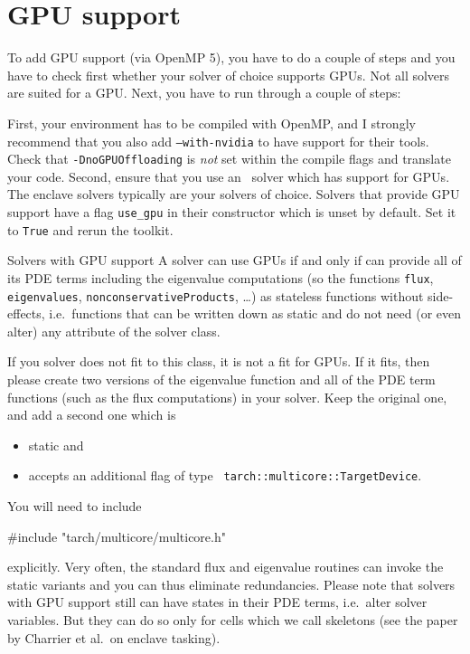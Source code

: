 \section{GPU support}

To add GPU support (via OpenMP 5), you have to do a couple of steps
and you have to check first whether your solver of choice supports
GPUs. 
Not all solvers are suited for a GPU.
Next, you have to run through a couple of steps:


First, your environment has to be compiled with OpenMP, and I strongly recommend
that you also add \texttt{--with-nvidia} to have support for their tools.
Check that \texttt{-DnoGPUOffloading} is \emph{not} set within the compile
flags and translate your code.
Second, ensure that you use an \ExaHyPE\ solver which has support for GPUs. 
The enclave solvers typically are your solvers of choice.
Solvers that provide GPU support have a flag \texttt{use\_gpu} in their
constructor which is unset by default. 
Set it to \texttt{True} and rerun the toolkit.

\begin{definition}{Solvers with GPU support}
 A solver can use GPUs if and only if can provide all of its PDE terms
 including the eigenvalue computations (so the functions \texttt{flux},
 \texttt{eigenvalues}, \texttt{nonconservativeProducts}, \ldots) as stateless
 functions without side-effects, i.e.~functions that can be written down as
 static and do not need (or even alter) any attribute of the solver class.
\end{definition}

\noindent
If you solver does not fit to this class, it is not a fit for GPUs.
If it fits, then please create two versions of the eigenvalue function and all
of the PDE term functions (such as the flux computations) in your solver.
Keep the original one, and add a second one which is 

\begin{itemize}
  \item static and 
  \item accepts an additional flag of type \texttt{
  tarch::multicore::TargetDevice}.
\end{itemize}

\noindent
You will need to include 
\begin{code}
#include "tarch/multicore/multicore.h"
\end{code} 

\noindent
explicitly. Very often, the standard flux and eigenvalue routines can invoke the
static variants and you can thus eliminate redundancies.
Please note that solvers with GPU support still can have states in their PDE
terms, i.e.~alter solver variables.
But they can do so only for cells which we call skeletons (see the paper by
Charrier et al.~on enclave tasking).


